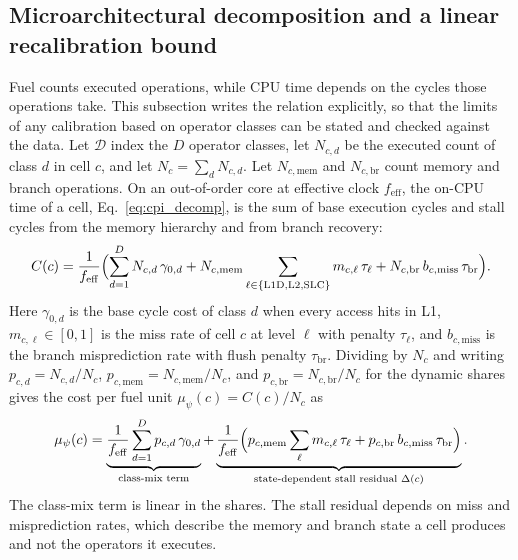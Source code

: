 \documentclass{ws-jcsc}
\begin{document}
\subsection{Microarchitectural decomposition and a linear recalibration bound}
\label{subsec:decomposition}
Fuel counts executed operations, while CPU time depends on the cycles those operations take. This subsection writes the relation explicitly, so that the limits of any calibration based on operator classes can be stated and checked against the data. Let $\mathcal{D}$ index the $D$ operator classes, let $N_{c,d}$ be the executed count of class $d$ in cell $c$, and let $N_c=\sum_{d}N_{c,d}$. Let $N_{c,\mathrm{mem}}$ and $N_{c,\mathrm{br}}$ count memory and branch operations. On an out-of-order core at effective clock $f_{\mathrm{eff}}$, the on-CPU time of a cell, Eq.~\eqref{eq:cpi_decomp}, is the sum of base execution cycles and stall cycles from the memory hierarchy and from branch recovery:
\begin{equation}\label{eq:cpi_decomp}
C(c)=\frac{1}{f_{\mathrm{eff}}}\Bigl(\sum_{d=1}^{D}N_{c,d}\,\gamma_{0,d}+N_{c,\mathrm{mem}}\sum_{\ell\in\{\mathrm{L1D},\mathrm{L2},\mathrm{SLC}\}}m_{c,\ell}\,\tau_{\ell}+N_{c,\mathrm{br}}\,b_{c,\mathrm{miss}}\,\tau_{\mathrm{br}}\Bigr).
\end{equation}
Here $\gamma_{0,d}$ is the base cycle cost of class $d$ when every access hits in L1, $m_{c,\ell}\in[0,1]$ is the miss rate of cell $c$ at level $\ell$ with penalty $\tau_{\ell}$, and $b_{c,\mathrm{miss}}$ is the branch misprediction rate with flush penalty $\tau_{\mathrm{br}}$. Dividing by $N_c$ and writing $p_{c,d}=N_{c,d}/N_c$, $p_{c,\mathrm{mem}}=N_{c,\mathrm{mem}}/N_c$, and $p_{c,\mathrm{br}}=N_{c,\mathrm{br}}/N_c$ for the dynamic shares gives the cost per fuel unit $\mu_\psi(c)=C(c)/N_c$ as
\begin{equation}\label{eq:psi_decomp}
\mu_\psi(c)=\underbrace{\frac{1}{f_{\mathrm{eff}}}\sum_{d=1}^{D}p_{c,d}\,\gamma_{0,d}}_{\text{class-mix term}}+\underbrace{\frac{1}{f_{\mathrm{eff}}}\Bigl(p_{c,\mathrm{mem}}\sum_{\ell}m_{c,\ell}\,\tau_{\ell}+p_{c,\mathrm{br}}\,b_{c,\mathrm{miss}}\,\tau_{\mathrm{br}}\Bigr)}_{\text{state-dependent stall residual }\Delta(c)}.
\end{equation}
The class-mix term is linear in the shares. The stall residual depends on miss and misprediction rates, which describe the memory and branch state a cell produces and not the operators it executes.
\end{document}
